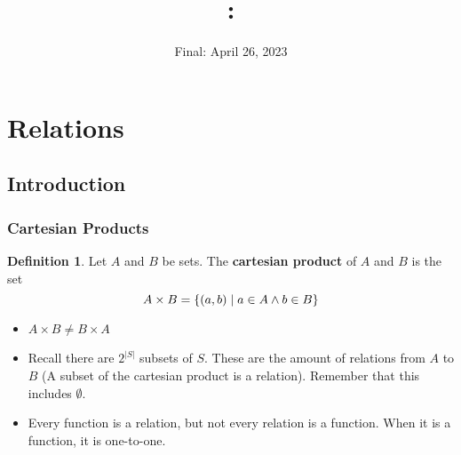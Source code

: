 \documentclass[article, 12pt]{article}
\title{
    \vspace{2in}
    \textmd{\textbf{\courseNumber: \courseName}}
    \normalsize\vspace{0.1in}\\
    \vspace{0.1in}\large{\text{\professor}}
    \vspace{3in}
}
\author{\name}
\date{Final: April 26, 2023}
\theoremstyle{definition}
\newtheorem{definition}{Definition}[subsection]
\DeclarePairedDelimiter\set{\{}{\}}
\begin{document}
    \maketitle
    \thispagestyle{empty}
    \pagebreak
    \tableofcontents
    \pagebreak

    \section{Relations}
    \subsection{Introduction}
    \subsubsection{Cartesian Products}
    \begin{definition}
    \label{def:cartesian product}
        Let $A$ and $B$ be sets. The \textbf{cartesian product} of $A$ and $B$ is the set
        \begin{equation}
            A \times B = \set*{(a, b) \mid a \in A \land b \in B}
        \end{equation}
    \end{definition}
    \begin{itemize}
        \item $A \times B \neq B \times A$
        \item Recall there are $2^{|S|}$ subsets of $S$. These are the amount of relations from $A$ to $B$ (A subset of the cartesian product is a relation). Remember that this includes $\emptyset$.
        \item Every function is a relation, but not every relation is a function. When it is a function, it is one-to-one.
    \end{itemize}
\end{document}
